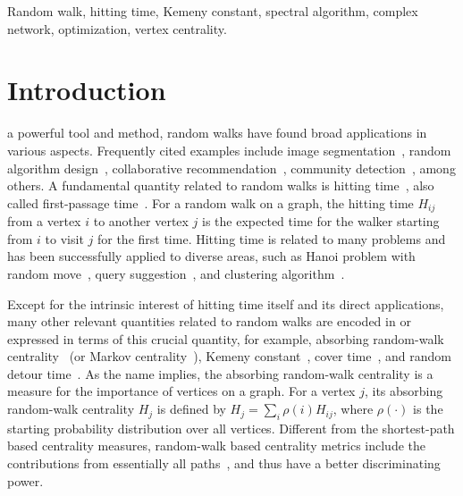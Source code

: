 \documentclass[10pt,twocolumn,twoside]{IEEEtran}
\begin{document}
{    \begin{IEEEkeywords}
        Random walk, hitting time, Kemeny constant, spectral algorithm, complex network, optimization, vertex centrality.
    \end{IEEEkeywords}
}

\maketitle

\IEEEdisplaynontitleabstractindextext

\IEEEpeerreviewmaketitle

\section{Introduction}\label{sec:intro}

 a powerful tool and method, random walks have found broad applications in various aspects.
Frequently cited examples include image segmentation~\cite{Le06}, random algorithm design~\cite{SaDi12}, collaborative recommendation~\cite{FoPiReSa07}, community detection~\cite{LaDeBa14}, among others.
A fundamental quantity related to random walks is hitting time~\cite{Lo93,ShZh19}, also called first-passage time~\cite{CoBeTeVoKl07}.
For a random walk on a graph, the hitting time \(H_{ij}\) from a vertex \(i\) to another vertex \(j\) is the expected time for the walker starting from \(i\) to visit \(j\) for the first time.
Hitting time is related to many problems and has been successfully applied to diverse areas, such as Hanoi problem with random move~\cite{WuZhCh11,QiDoZhZh20}, query suggestion~\cite{MeZhCh08}, and clustering algorithm~\cite{ChLiTa08}.

Except for the intrinsic interest of hitting time itself and its direct applications, many other relevant quantities related to random walks are encoded in or expressed in terms of this crucial quantity, for example, absorbing random-walk centrality~\cite{MaMaGi15} (or Markov centrality~\cite{WhSm03}), Kemeny constant~\cite{Hu14}, cover time~\cite{BlJaRy22,XuZh23}, and random detour time~\cite{BoRaZh11,RaZh13}.
As the name implies, the absorbing random-walk centrality is a measure for the importance of vertices on a graph.
For a vertex \(j\), its absorbing random-walk centrality \(H_j\) is defined by \(H_j=\sum_{i} \rho(i) H_{ij}\), where \(\rho(\cdot)\) is the starting probability distribution over all vertices.
Different from the shortest-path based centrality measures, random-walk based centrality metrics include the contributions from essentially all paths~\cite{Ne05}, and thus have a better discriminating power.
\end{document}
